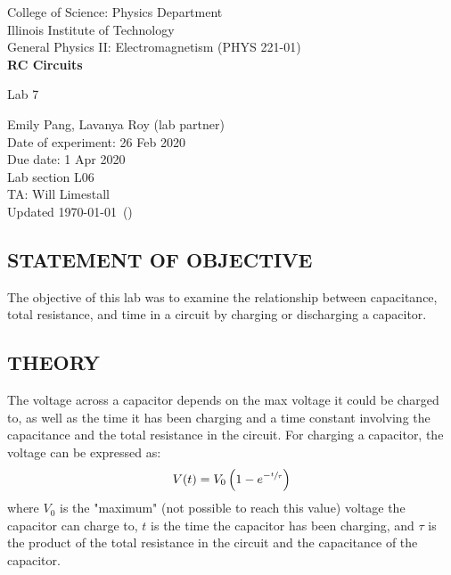 \documentclass [12pt, letterpaper, twoside] {article}
\begin{document}
\begin {titlepage}
\begin {center}
College of Science: Physics Department \\
\vspace {0.1cm}
Illinois Institute of Technology\\
\vspace {0.1cm}
General Physics II: Electromagnetism (PHYS 221-01)\\
\vspace* {\fill}
\begingroup
\Large
\textbf {RC Circuits}
\vspace {0.35cm}

\normalsize
Lab 7 
\vspace {1.5cm}
\endgroup
\vspace* {\fill}
\end {center}

\vspace*{\fill}
\begin {flushright}
\footnotesize
Emily Pang, Lavanya Roy (lab partner) \\
Date of experiment: 26 Feb 2020 \\
Due date: 1 Apr 2020 \\
Lab section L06 \\
TA: Will Limestall \\
Updated \usdate\today~(\currenttime)
\end {flushright}
\end {titlepage}
\subsection* {STATEMENT OF OBJECTIVE}
The objective of this lab was to examine the relationship between capacitance, total resistance, and time in a circuit by charging or discharging a capacitor.

\subsection* {THEORY}
The voltage across a capacitor depends on the max voltage it could be charged to, as well as the time it has been charging and a time constant involving the capacitance and the total resistance in the circuit. For charging a capacitor, the voltage can be expressed as:
\begin{equation}
  \begin{split}
    V(t) &= V_{\text{0}}\left(1-e^{-\sfrac{t}{\tau}}\right) \\
  \end{split}
\end{equation}
where \(V_{\text{0}}\) is the "maximum" (not possible to reach this value) voltage the capacitor can charge to, \(t\) is the time the capacitor has been charging, and \(\tau\) is the product of the total resistance in the circuit and the capacitance of the capacitor.
\end{document}
